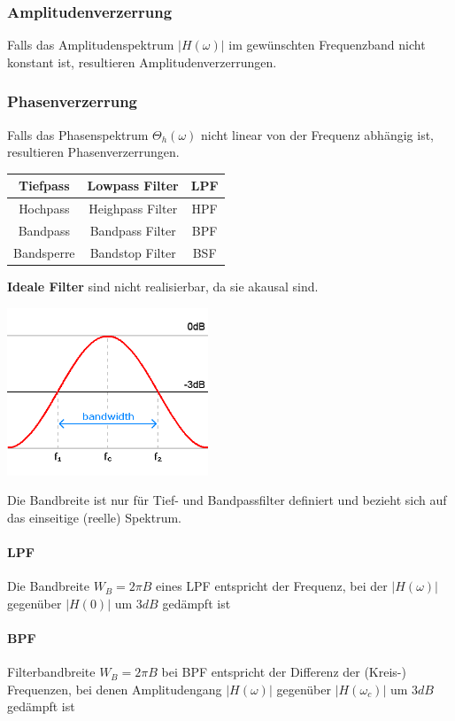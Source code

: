 \subsubsection{Amplitudenverzerrung}
Falls das Amplitudenspektrum $|H(\omega)|$ im gewünschten Frequenzband nicht konstant ist,
resultieren Amplitudenverzerrungen.

\subsubsection{Phasenverzerrung}
Falls das Phasenspektrum $\Theta_h (\omega)$ nicht linear von der Frequenz abhängig ist, resultieren
Phasenverzerrungen.\\



\begin{multicols}{2}
\begin{center}
\begin{tabular}{|c|c|c|}
\hline
Tiefpass & Lowpass Filter & LPF \\
\hline
Hochpass & Heighpass Filter & HPF \\
\hline
Bandpass & Bandpass Filter & BPF \\
\hline
Bandsperre & Bandstop Filter & BSF \\
\hline
\end{tabular}
\end{center}
\columnbreak

\textbf{Ideale Filter} sind nicht realisierbar, da sie akausal sind.
\end{multicols}

\begin{minipage}{7cm}
	\includegraphics[width=6cm]{bilder/filter_bandbreite.png}
\end{minipage}
\begin{minipage}{11cm}
	Die Bandbreite ist nur für Tief- und Bandpassfilter definiert und bezieht sich auf das einseitige (reelle) Spektrum.
	\paragraph{LPF}	Die Bandbreite $W_B = 2 \pi B$ eines LPF entspricht der Frequenz, bei der $|H(\omega)|$ gegenüber $|H(0)|$ um $3 dB$ gedämpft ist
	\paragraph{BPF}	Filterbandbreite $W_B = 2 \pi B$ bei BPF entspricht der Differenz der (Kreis-) Frequenzen, bei denen Amplitudengang $|H(\omega)|$ gegenüber $|H(\omega_c)|$ um
	$3 dB$ gedämpft ist
\end{minipage}


